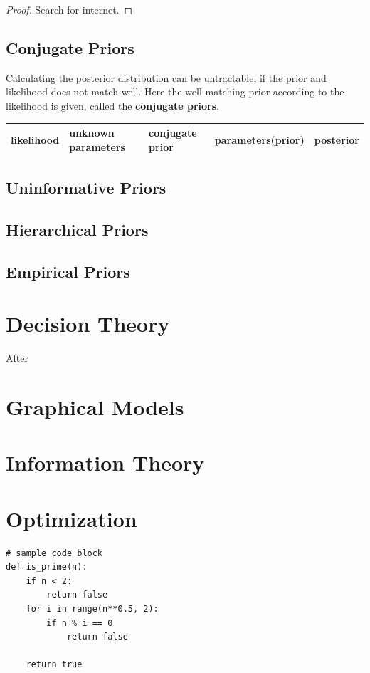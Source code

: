 \documentclass{report}
\begin{document}
            \begin{proof}
                Search for internet.
            \end{proof}

    \section{Conjugate Priors}\label{sec:ConjugatePrior}
    Calculating the posterior distribution can be untractable, if the prior and likelihood does not match well.
    Here the well-matching prior according to the likelihood is given, called the \textbf{conjugate priors}.

    \begin{center}
    \begin{tabularx}{\textwidth}{XXXXX}
        \toprule
        \textbf{likelihood} &
        \textbf{unknown parameters} &
        \textbf{conjugate prior} &
        \textbf{parameters(prior)} &
        \textbf{posterior}
        \\
        \midrule
            
        \bottomrule
    \end{tabularx}
    \end{center}

    \section{Uninformative Priors}\label{sec:UninformativePrior}
    \section{Hierarchical Priors}\label{sec:HierPrior}
    \section{Empirical Priors}\label{sec:EmpPrior}

\chapter{Decision Theory}
After
\chapter{Graphical Models}
\chapter{Information Theory}
\chapter{Optimization}

\begin{verbatim}
# sample code block
def is_prime(n):
    if n < 2:
        return false
    for i in range(n**0.5, 2):
        if n % i == 0
            return false
        
    return true
\end{verbatim}
\end{document}
